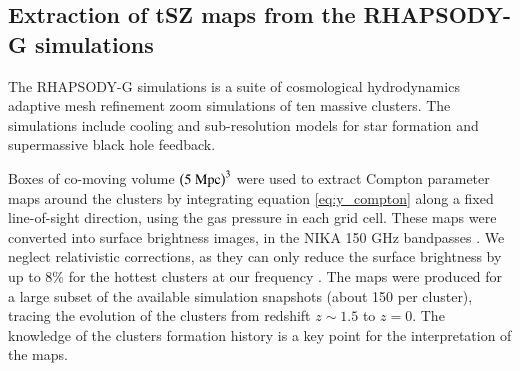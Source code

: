 \documentclass[twocolumn,traditabstract]{aa}
\begin{document}
\subsection{Extraction of tSZ maps from the RHAPSODY-G simulations}
The RHAPSODY-G simulations \citep{Wu2013,Hahn2017} is a suite of cosmological hydrodynamics adaptive mesh refinement zoom simulations of ten massive clusters. The simulations include cooling and sub-resolution models for star formation and supermassive black hole feedback. 

Boxes of co-moving volume $\left(5 \ {\rm Mpc}\right)^3$ were used to extract Compton parameter maps around the clusters by integrating equation \ref{eq:y_compton} along a fixed line-of-sight direction, using the gas pressure in each grid cell. These maps were converted into surface brightness images, in the NIKA 150 GHz bandpasses \citep[see the coefficient provided in][]{Adam2016b}. We neglect relativistic corrections, as they can only reduce the surface brightness by up to 8\% for the hottest clusters at our frequency \citep{Itoh2003}. The maps were produced for a large subset of the available simulation snapshots (about 150 per cluster), tracing the evolution of the clusters from redshift $z \sim 1.5$ to $z=0$. The knowledge of the clusters formation history is a key point for the interpretation of the maps.

\end{document}
